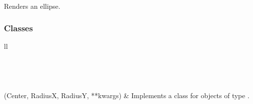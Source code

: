 \documentclass[letterpaper,10pt,english]{sphinxmanual}
\begin{document}
Renders an ellipse.


\subsubsection{Classes}
\label{Chapters/PythonModuleReference/Patterns/TXLWizard.Patterns.Ellipse:classes}
\begin{longtable}{ll}
\hline
\endfirsthead

%
{{}} \\
\hline
\endhead

\hline {} \\ \hline
\endfoot

\endlastfoot


{\hyperref[Chapters/PythonModuleReference/Patterns/TXLWizard.Patterns.Ellipse:TXLWizard.Patterns.Ellipse.Ellipse]{}}(Center, RadiusX, RadiusY, **kwargs)
 & 
Implements a class for  objects of type .
\\
\hline\end{longtable}

\end{document}
